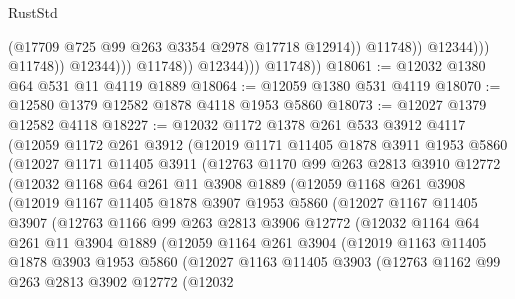\begin{lexlean}{RustStd}
\begin{coremodule}
                                        (@17709 @725 @99 @263 @3354 @2978 @17718 @12914))
                                      @11748))
                                  @12344)))
                            @11748))
                        @12344)))
                  @11748))
              @12344)))
        @11748))
@18061 := @12032 @1380 @64 @531 @11 @4119 @1889
@18064 := @12059 @1380 @531 @4119
@18070 := @12580 @1379 @12582 @1878 @4118 @1953 @5860
@18073 := @12027 @1379 @12582 @4118
@18227 := @12032
    @1172
    @1378
    @261
    @533
    @3912
    @4117
    (@12059
      @1172
      @261
      @3912
      (@12019
        @1171
        @11405
        @1878
        @3911
        @1953
        @5860
        (@12027
          @1171
          @11405
          @3911
          (@12763
            @1170
            @99
            @263
            @2813
            @3910
            @12772
            (@12032
              @1168
              @64
              @261
              @11
              @3908
              @1889
              (@12059
                @1168
                @261
                @3908
                (@12019
                  @1167
                  @11405
                  @1878
                  @3907
                  @1953
                  @5860
                  (@12027
                    @1167
                    @11405
                    @3907
                    (@12763
                      @1166
                      @99
                      @263
                      @2813
                      @3906
                      @12772
                      (@12032
                        @1164
                        @64
                        @261
                        @11
                        @3904
                        @1889
                        (@12059
                          @1164
                          @261
                          @3904
                          (@12019
                            @1163
                            @11405
                            @1878
                            @3903
                            @1953
                            @5860
                            (@12027
                              @1163
                              @11405
                              @3903
                              (@12763
                                @1162
                                @99
                                @263
                                @2813
                                @3902
                                @12772
                                (@12032

\end{coremodule}
\end{lexlean}
